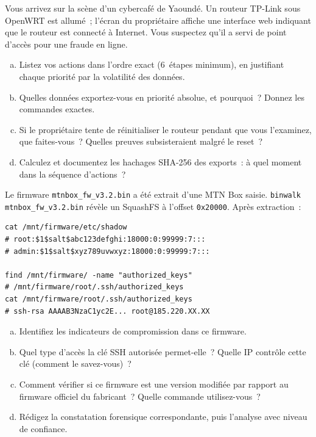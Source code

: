 \bigskip

\begin{boxexo}[title={\ding{45}\quad Exercice~18.1 --- Priorité de collecte IoT \niveaubase}]
Vous arrivez sur la scène d'un cybercafé de Yaoundé. Un routeur TP-Link
sous OpenWRT est allumé~; l'écran du propriétaire affiche une interface
web indiquant que le routeur est connecté à Internet. Vous suspectez
qu'il a servi de point d'accès pour une fraude en ligne.
\begin{enumerate}[(a)]
    \item Listez vos actions dans l'ordre exact (6~étapes minimum),
          en justifiant chaque priorité par la volatilité des données.
    \item Quelles données exportez-vous en priorité absolue, et
          pourquoi~? Donnez les commandes exactes.
    \item Si le propriétaire tente de réinitialiser le routeur
          pendant que vous l'examinez, que faites-vous~? Quelles
          preuves subsisteraient malgré le reset~?
    \item Calculez et documentez les hachages SHA-256 des
          exports~: à quel moment dans la séquence d'actions~?
\end{enumerate}
\end{boxexo}

\begin{boxexo}[title={\ding{45}\quad Exercice~18.2 --- Analyse firmware \niveaumoyen}]
Le firmware \texttt{mtnbox\_fw\_v3.2.bin} a été extrait d'une MTN Box
saisie. \texttt{binwalk mtnbox\_fw\_v3.2.bin} révèle un SquashFS à
l'offset \texttt{0x20000}. Après extraction~:
\begin{lstlisting}[language=bash_forensique]
cat /mnt/firmware/etc/shadow
# root:$1$salt$abc123defghi:18000:0:99999:7:::
# admin:$1$salt$xyz789uvwxyz:18000:0:99999:7:::

find /mnt/firmware/ -name "authorized_keys"
# /mnt/firmware/root/.ssh/authorized_keys
cat /mnt/firmware/root/.ssh/authorized_keys
# ssh-rsa AAAAB3NzaC1yc2E... root@185.220.XX.XX
\end{lstlisting}
\begin{enumerate}[(a)]
    \item Identifiez les indicateurs de compromission dans ce firmware.
    \item Quel type d'accès la clé SSH autorisée permet-elle~?
          Quelle IP contrôle cette clé (comment le savez-vous)~?
    \item Comment vérifier si ce firmware est une version modifiée
          par rapport au firmware officiel du fabricant~? Quelle
          commande utilisez-vous~?
    \item Rédigez la constatation forensique correspondante, puis
          l'analyse avec niveau de confiance.
\end{enumerate}
\end{boxexo}

